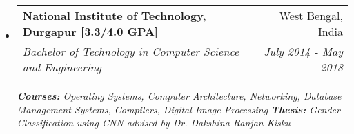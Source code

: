 \documentclass[a4paper,20pt]{article}
\makeatletter
\newcommand{\resumeSubheading}[4]{
  \vspace{-1pt}\item
    \begin{tabular*}{0.97\textwidth}{l@{\extracolsep{\fill}}r}
      \textbf{#1} & #2 \\
      \textit{#3} & \textit{#4} \\
    \end{tabular*}\vspace{-5pt}
}
\newcommand{\resumeSubHeadingListStart}{\begin{itemize}[leftmargin=*]}
\newcommand{\resumeSubHeadingListEnd}{\end{itemize}}
\makeatother
\begin{document}
    \resumeSubHeadingListStart
    \resumeSubheading
      {National Institute of Technology, Durgapur [3.3/4.0 GPA]}{West Bengal, India}
      {Bachelor of Technology in Computer Science and Engineering}{July 2014 - May 2018}
      {\scriptsize \textit{ \footnotesize{\newline{}\textbf{Courses:} Operating Systems, Computer Architecture, Networking, Database Management Systems, Compilers, Digital Image Processing}}}
      {\scriptsize \textit{ \footnotesize{\newline{}\textbf{Thesis:} Gender Classification using CNN advised by Dr. Dakshina Ranjan Kisku}}}
    \resumeSubHeadingListEnd
	    
\vspace{-8pt}
\end{document}
